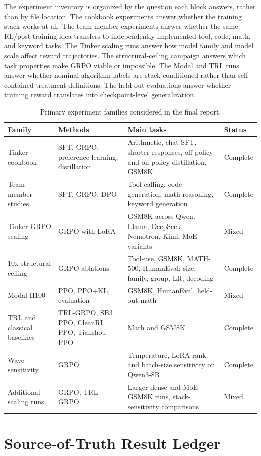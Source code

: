 \documentclass[12pt,a4paper]{report}
\begin{document}
The experiment inventory is organized by the question each block answers, rather than by file location. The cookbook experiments answer whether the training stack works at all. The team-member experiments answer whether the same RL/post-training idea transfers to independently implemented tool, code, math, and keyword tasks. The Tinker scaling runs answer how model family and model scale affect reward trajectories. The structural-ceiling campaign answers which task properties make GRPO viable or impossible. The Modal and TRL runs answer whether nominal algorithm labels are stack-conditioned rather than self-contained treatment definitions. The held-out evaluations answer whether training reward translates into checkpoint-level generalization.

\begin{table}[ht]
\centering
\caption{Primary experiment families considered in the final report.}
\label{tab:experiment-families}
\footnotesize
\begin{tabularx}{\textwidth}{p{3.1cm}p{3.1cm}Xp{2.0cm}}
\toprule
Family & Methods & Main tasks & Status\\
\midrule
Tinker cookbook & SFT, GRPO, preference learning, distillation & Arithmetic, chat SFT, shorter responses, off-policy and on-policy distillation, GSM8K & Complete\\
Team member studies & SFT, GRPO, DPO & Tool calling, code generation, math reasoning, keyword generation & Complete\\
Tinker GRPO scaling & GRPO with LoRA & GSM8K across Qwen, Llama, DeepSeek, Nemotron, Kimi, MoE variants & Mixed\\
10x structural ceiling & GRPO ablations & Tool-use, GSM8K, MATH-500, HumanEval; size, family, group, LR, decoding & Complete\\
Modal H100 & PPO, PPO+KL, evaluation & GSM8K, HumanEval, held-out math & Mixed\\
TRL and classical baselines & TRL-GRPO, SB3 PPO, CleanRL PPO, Tianshou PPO & Math and GSM8K & Complete\\
Wave sensitivity & GRPO & Temperature, LoRA rank, and batch-size sensitivity on Qwen3-8B & Complete\\
Additional scaling runs & GRPO, TRL-GRPO & Larger dense and MoE GSM8K runs, stack-sensitivity comparisons & Mixed\\
\bottomrule
\end{tabularx}
\end{table}

\section{Source-of-Truth Result Ledger}
\label{sec:source-of-truth-ledger}
\end{document}
